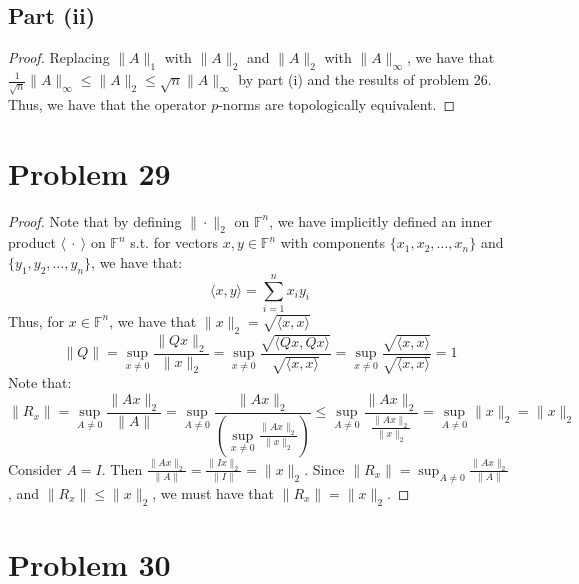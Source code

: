 \documentclass{article}
\begin{document}
\subsection*{Part (ii)}

\begin{proof}
Replacing $\|A\|_1$ with $ \|A\|_2$ and  $\|A\|_2$ with $ \|A\|_{\infty}$, we have that $\frac{1}{\sqrt{n}}\|A\|_{\infty} \leq \|A\|_2 \leq \sqrt{n}\|A\|_{\infty}$ by part (i) and the results of problem 26. Thus, we have that the operator $p$-norms are topologically equivalent.
\end{proof}


\section*{Problem 29}

\begin{proof}
Note that by defining $\| \cdot \|_2$ on $\mathbb{F}^n$, we have implicitly defined an inner product $\langle \ \cdot \ \rangle$ on $\mathbb{F}^n$ s.t. for vectors $x, y \in \mathbb{F}^n$ with components $\{x_1, x_2, \dots, x_n\}$ and $\{y_1, y_2, \dots, y_n\}$, we have that:
$$\langle x, y \rangle = \sum\limits_{i = 1}^n x_{i}y_{i}$$
Thus, for $x \in \mathbb{F}^n$, we have that $\|x\|_2 = \sqrt{\langle x, x \rangle}$ \\
$$\|Q\| = \sup_{x \ne 0} \frac{\|Qx\|_2}{\|x\|_2} = \sup_{x \ne 0} \frac{\sqrt{\langle Qx, Qx \rangle}}{\sqrt{\langle x, x \rangle}} =\sup_{x \ne 0} \frac{\sqrt{\langle x, x \rangle}}{\sqrt{\langle x, x \rangle}} = 1$$
Note that:
$$\|R_x\| = \sup_{A \ne 0} \frac{\|Ax\|_2}{\|A\|} =  \sup_{A \ne 0} \frac{\|Ax\|_2}{\left(\sup_{x \ne 0} \frac{\|Ax\|_2}{\|x\|_2}\right)} \leq \sup_{A \ne 0} \frac{\|Ax\|_2}{\frac{\|Ax\|_2}{\|x\|_2}} = \sup_{A \ne 0} \|x\|_2 = \|x\|_2$$
Consider $A = I$. Then $\frac{\|Ax\|_2}{\|A\|} = \frac{\|Ix\|_2}{\|I\|} =  \|x\|_2$. Since $\|R_x\| = \sup_{A \ne 0} \frac{\|Ax\|_2}{\|A\|}$, and $\|R_x\| \leq \|x\|_2$, we must have that $\|R_x\| = \|x\|_2$.
\end{proof}

\section*{Problem 30}
\end{document}
